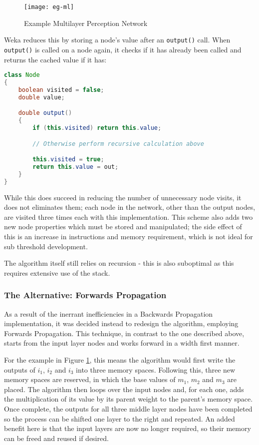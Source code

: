\begin{figure}[!h]
    \centering
    \texttt{[image: eg-ml]}
    \caption{Example Multilayer Perception Network}
    \label{fig:eg-ml}
\end{figure}

Weka reduces this by storing a node's value after an \verb|output()| call. When \verb|output()| is called on a node again, it checks if it has already been called and returns the cached value if it has:

\begin{lstlisting}[language=Java,caption={Weka's method of preventing repeated calculations}]
class Node
{
    boolean visited = false;
    double value;

    double output()
    {
        if (this.visited) return this.value;

        // Otherwise perform recursive calculation above

        this.visited = true;
        return this.value = out;
    }
}
\end{lstlisting}

While this does succeed in reducing the number of unnecessary node visits, it does not eliminates them; each node in the network, other than the output nodes, are visited three times each with this implementation. This scheme also adds two new node properties which must be stored and manipulated; the side effect of this is an increase in instructions and memory requirement, which is not ideal for sub threshold development.

The algorithm itself still relies on recursion - this is also suboptimal as this requires extensive use of the stack.

\subsubsection{The Alternative: Forwards Propagation}

As a result of the inerrant inefficiencies in a Backwards Propagation implementation, it was decided instead to redesign the algorithm, employing Forwards Propagation. This technique, in contrast to the one described above, starts from the input layer nodes and works forward in a width first manner.

For the example in Figure \ref{fig:eg-ml}, this means the algorithm would first write the outputs of $i_1$, $i_2$ and $i_3$ into three memory spaces. Following this, three new memory spaces are reserved, in which the base values of $m_1$, $m_2$ and $m_3$ are placed. The algorithm then loops over the input nodes and, for each one, adds the multiplication of its value by its parent weight to the parent's memory space. Once complete, the outputs for all three middle layer nodes have been completed so the process can be shifted one layer to the right and repeated. An added benefit here is that the input layers are now no longer required, so their memory can be freed and reused if desired.

